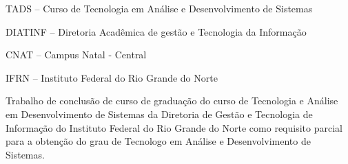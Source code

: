 
\titulo{\Large{\thesistitle}}
\autor{\thesisauthor}
\orientador[Orientador]{\par \thesissupervisor}
\instituicao
{
	TADS -- Curso de Tecnologia em Análise e Desenvolvimento de
	Sistemas\par
	DIATINF -- Diretoria Acadêmica de gestão e Tecnologia da Informação\par
	CNAT -- Campus Natal - Central\par
	IFRN -- Instituto Federal do Rio Grande do Norte }

\comentario
{
	Trabalho de conclusão de curso de graduação do curso de Tecnologia e Análise em
	Desenvolvimento de Sistemas da Diretoria de Gestão e Tecnologia de Informação
	do Instituto Federal do Rio Grande do Norte como requisito parcial para a
	obtenção do grau de Tecnologo em Análise e Desenvolvimento de
	Sistemas.
}


\folhaderosto